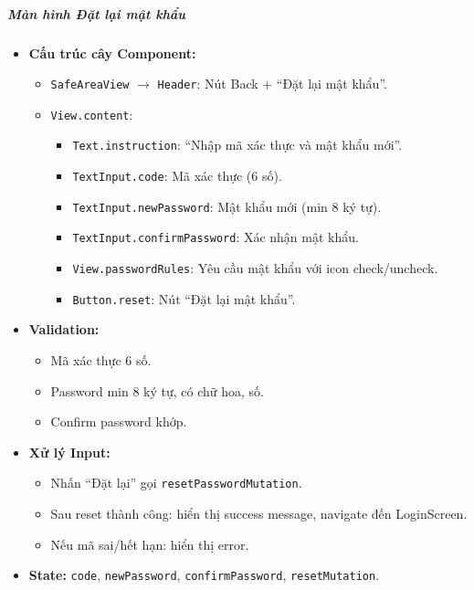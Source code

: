 \subparagraph{Màn hình Đặt lại mật khẩu}
\begin{itemize}
    \item \textbf{Cấu trúc cây Component:}
        \begin{itemize}
            \item \texttt{SafeAreaView} $\rightarrow$ \texttt{Header}: Nút Back + ``Đặt lại mật khẩu''.
            \item \texttt{View.content}:
                \begin{itemize}
                    \item \texttt{Text.instruction}: ``Nhập mã xác thực và mật khẩu mới''.
                    \item \texttt{TextInput.code}: Mã xác thực (6 số).
                    \item \texttt{TextInput.newPassword}: Mật khẩu mới (min 8 ký tự).
                    \item \texttt{TextInput.confirmPassword}: Xác nhận mật khẩu.
                    \item \texttt{View.passwordRules}: Yêu cầu mật khẩu với icon check/uncheck.
                    \item \texttt{Button.reset}: Nút ``Đặt lại mật khẩu''.
                \end{itemize}
        \end{itemize}
    \item \textbf{Validation:}
        \begin{itemize}
            \item Mã xác thực 6 số.
            \item Password min 8 ký tự, có chữ hoa, số.
            \item Confirm password khớp.
        \end{itemize}
    \item \textbf{Xử lý Input:}
        \begin{itemize}
            \item Nhấn ``Đặt lại'' gọi \texttt{resetPasswordMutation}.
            \item Sau reset thành công: hiển thị success message, navigate đến LoginScreen.
            \item Nếu mã sai/hết hạn: hiển thị error.
        \end{itemize}
    \item \textbf{State:} \texttt{code}, \texttt{newPassword}, \texttt{confirmPassword}, \texttt{resetMutation}.
\end{itemize}

